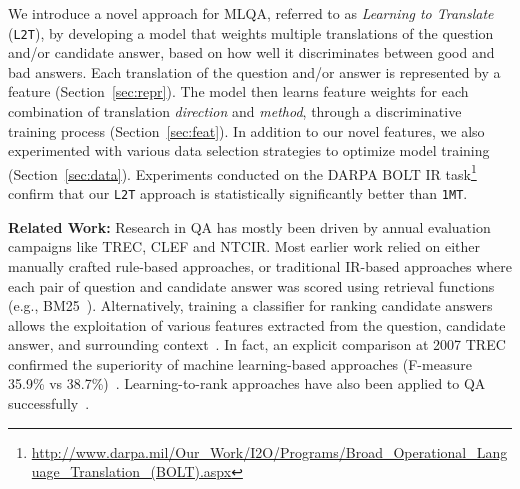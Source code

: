 \documentclass{sig-alternate-05-2015}
\begin{document}

We introduce a novel approach for MLQA, referred to as \emph{Learning to Translate} ({\tt L2T}), by developing a model that 
weights multiple translations of the question and/or candidate answer, based on how well it discriminates between good and bad answers.
Each translation of the question and/or answer is represented by a feature (Section~\ref{sec:repr}). The model then learns feature weights for 
each combination of translation \emph{direction} and \emph{method}, through a discriminative training process (Section~\ref{sec:feat}). 
In addition to our novel features, we also experimented with various data selection strategies to optimize model training (Section~\ref{sec:data}). 
Experiments conducted on the DARPA BOLT IR task\footnote{{\scriptsize \url{
http://www.darpa.mil/Our_Work/I2O/Programs/Broad_Operational_Language_Translation_(BOLT).aspx}}} 
confirm that our {\tt L2T} approach is statistically significantly better than {\tt 1MT}.


\textbf{Related Work:}
Research in QA has mostly been driven by annual evaluation campaigns like TREC,%
CLEF
and NTCIR.
Most earlier work relied on either manually crafted rule-based approaches, or 
traditional IR-based approaches where each pair of question and candidate answer was scored using retrieval functions (e.g., 
BM25~\cite{Robertson:2004}). Alternatively, training a classifier for ranking candidate answers allows the exploitation of 
various features extracted from the question, candidate answer, and surrounding context~\cite{Madnani:2007aa,Zhang:2007aa}. 
In fact, an explicit comparison at 2007 TREC confirmed the superiority of machine learning-based approaches (F-measure 35.9\%
vs 38.7\%)~\cite{Zhang:2007aa}. Learning-to-rank approaches have also been applied to QA successfully~\cite{Agarwal:2012aa}.
\end{document}
